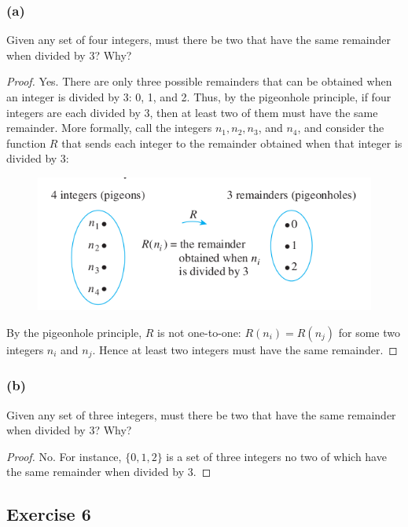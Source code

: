 \documentclass[14pt]{extarticle}
\begin{document}
\subsubsection{(a)}
Given any set of four integers, must there be two that have the same remainder when divided by 3? Why?

\begin{proof}
Yes. There are only three possible remainders that can be obtained when an integer is divided by 3: 0, 1, and 2. 
Thus, by the pigeonhole principle, if four integers are each divided by 3, then at least two of them must have the 
same remainder. More formally, call the integers \(n_1, n_2, n_3\), and \(n_4\), and consider the function \(R\) 
that sends each integer to the remainder obtained when that integer is divided by 3:

\begin{figure}[ht!]
\centering
\includegraphics[scale=0.5]{../images/9.4.5.a.png}
\end{figure}

By the pigeonhole principle, \(R\) is not one-to-one: \(R(n_i) = R(n_j)\) for some two integers \(n_i\) and 
\(n_j\). Hence at least two integers must have the same remainder.
\end{proof}

\subsubsection{(b)}
Given any set of three integers, must there be two that have the same remainder when divided by 3? Why?

\begin{proof}
No. For instance, \(\{0, 1, 2\}\) is a set of three integers no two of which have the same remainder when 
divided by 3.
\end{proof}

\subsection{Exercise 6}
\end{document}
